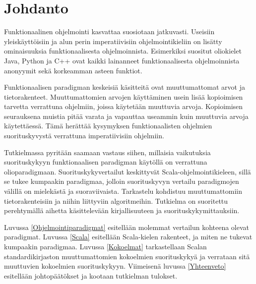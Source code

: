 \chapter{Johdanto} \label{Johdanto}
Funktionaalinen ohjelmointi kasvattaa suosiotaan jatkuvasti. Useisiin yleiskäyttöisiin ja alun perin imperatiivisiin ohjelmointikieliin on lisätty ominaisuuksia funktionaalisesta ohjelmoinnista. Esimerkiksi suositut oliokielet Java, Python ja C++ ovat kaikki lainanneet funktionaalisesta ohjelmoinnista anonyymit sekä korkeamman asteen funktiot.

Funktionaalisen paradigman keskeisiä käsitteitä ovat muuttumattomat arvot ja tietorakenteet. Muuttumattomien arvojen käyttäminen usein lisää kopioimisen tarvetta verrattuna ohjelmiin, joissa käytetään muuttuvia arvoja. Kopioimisen seurauksena muistia pitää varata ja vapauttaa useammin kuin muuttuvia arvoja käytettäessä. Tämä herättää kysymyksen funktionaalisten ohjelmien suorituskyvystä verrattuna imperatiivisiin ohjelmiin.

Tutkielmassa pyritään saamaan vastaus siihen, millaisia vaikutuksia suorituskykyyn funktionaalisen paradigman käytöllä on verrattuna olioparadigmaan. Suorituskykyvertailut keskittyvät Scala-ohjelmointikieleen, sillä se tukee kumpaakin paradigmaa, jolloin suorituskyvyn vertailu paradigmojen välillä on mielekästä ja suoraviivaista. Tarkastelu kohdistuu muuttumattomiin tietorakenteisiin ja niihin liittyviin algoritmeihin. Tutkielma on suoritettu perehtymällä aihetta käsittelevään kirjallisuuteen ja suorituskykymittauksiin.

Luvussa \ref{Ohjelmointiparadigmat} esitellään molemmat vertailun kohteena olevat paradigmat. Luvussa \ref{Scala} esitellään Scala-kielen rakenteet, ja miten ne tukevat kumpaakin paradigmaa. Luvussa \ref{Kokoelmat} tarkastellaan Scalan standardikirjaston muuttumattomien kokoelmien suorituskykyä ja verrataan sitä muuttuvien kokoelmien suorituskykyyn. Viimeisenä luvussa \ref{Yhteenveto} esitellään johtopäätökset ja kootaan tutkielman tulokset.
